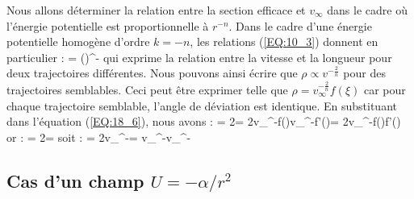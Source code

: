 Nous allons d\'eterminer la relation entre la section efficace et $v_{\infty}$ dans le cadre o\`u l'\'energie potentielle est proportionnelle \`a $r^{-n}$. Dans le cadre d'une \'energie potentielle homog\`ene d'ordre $k = -n$, les relations (\ref{EQ:10_3}) donnent en particulier :
\be
	 = \left(\right)^{-}
\ee
qui exprime la relation entre la vitesse et la longueur pour deux trajectoires diff\'erentes. Nous pouvons ainsi \'ecrire que $\rho\propto v^{-\frac{2}{n}}$ pour des trajectoires semblables. Ceci peut \^etre exprimer telle que $\rho = v_{\infty}^{-\frac{2}{n}}f(\xi)$ car pour chaque trajectoire semblable, l'angle de d\'eviation est identique. En substituant dans l'\'equation (\ref{EQ:18_6}), nous avons :
\be
	\sigma = 2\pi\rho{}\rho = 2\pi v_{\infty}^{-}f(\xi)\cdot v_{\infty}^{-}f'(\xi)\xi = 2\pi v_{\infty}^{-}f(\xi)f'(\xi)\xi
\ee
or :
\be
	\omega = 2\pi\sin\xi{}\xi \Rightarrow {}\xi = 
\ee
soit :
\be
	\sigma = 2\pi v_{\infty}^{-}\omega = v_{\infty}^{-}\omega \propto v_{\infty}^{-}\omega
\ee

\subsection{Cas d'un champ $U = -\alpha / r^{2}$}

